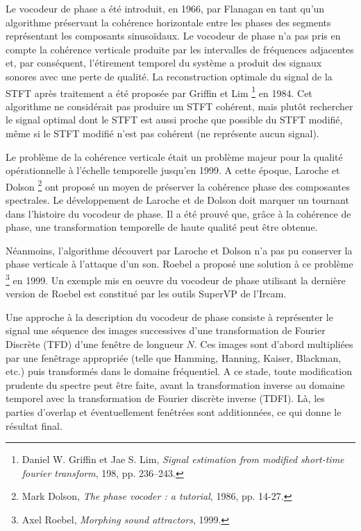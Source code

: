 Le vocodeur de phase a été introduit, en 1966, par Flanagan en tant qu'un algorithme préservant la cohérence horizontale entre les phases des segments représentant les composants sinusoïdaux. Le vocodeur de phase n'a pas pris en compte la cohérence verticale produite par les intervalles de fréquences adjacentes et, par conséquent, l'étirement temporel du système a produit des signaux sonores avec une perte de qualité. La reconstruction optimale du signal de la STFT après traitement a été proposée par Griffin et Lim \footnote{Daniel W. Griffin et Jae S. Lim, \textit{Signal estimation from modified short-time fourier transform}, 198, pp. 236–243.} en 1984. Cet algorithme ne considérait pas produire un STFT cohérent, mais plutôt rechercher le signal optimal dont le STFT est aussi proche que possible du STFT modifié, même si le STFT modifié n'est pas cohérent (ne représente aucun signal).

Le problème de la cohérence verticale était un problème majeur pour la qualité opérationnelle à l'échelle temporelle jusqu'en 1999. A cette époque, Laroche et Dolson \footnote{Mark Dolson, \textit{The phase vocoder : a tutorial}, 1986, pp. 14-27.} ont proposé un moyen de préserver la cohérence phase des composantes spectrales. Le développement de Laroche et de Dolson doit marquer un tournant dans l’histoire du vocodeur de phase. Il a été prouvé que, grâce à la cohérence de phase, une transformation temporelle de haute qualité peut être obtenue.

Néanmoins, l'algorithme découvert par Laroche et Dolson n'a pas pu conserver la phase verticale à l’attaque d’un son. Roebel a proposé une solution à ce problème \footnote{Axel Roebel, \textit{ Morphing sound attractors}, 1999.} en 1999. Un exemple mis en oeuvre du vocodeur de phase utilisant la dernière version de Roebel est constitué par les outils SuperVP de l’Ircam.

Une approche à la description du vocodeur de phase consiste à représenter le signal une séquence des images successives d’une transformation de Fourier Discrète (TFD) d’une fenêtre de longueur $ N$. Ces images sont d'abord multipliées par une fenêtrage appropriée (telle que Hamming, Hanning, Kaiser, Blackman, etc.) puis transformés dans le domaine fréquentiel. A ce stade, toute modification prudente du spectre peut être faite, avant la transformation inverse au domaine temporel avec la transformation de Fourier discrète inverse (TDFI). Là, les parties d'overlap et éventuellement fenêtrées sont additionnées, ce qui donne le résultat final.


